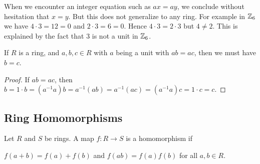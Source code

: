 \documentclass[11pt,fleqn,dvipsnames,usenames]{article}
\newcommand{\p}{\noindent}
\begin{document}
\p When we encounter an integer equation such as $ax = ay$, we conclude without hesitation that $x = y$.  But this does not generalize to any ring.  For example in $\mathbb{Z}_6$ we have $4\cdot 3 = 12 = 0$ and $2\cdot 3 = 6 = 0$.  Hence $4\cdot 3 = 2\cdot 3$ but $4\neq 2$.  This is explained by the fact that $3$ is not a unit in $\mathbb{Z}_6$.
\vsp

\begin{theorem}
If $R$ is a ring, and $a,b,c\in R$ with $a$ being a unit with $ab = ac$, then we must have $b = c$.
\end{theorem}
%
\begin{proof}
If $ab = ac$, then $b = 1\cdot b = (a^{-1}a)b = a^{-1}(ab) = a^{-1}(ac) = (a^{-1}a)c = 1\cdot c = c$.
\end{proof}
%
\subsection{Ring Homomorphisms}
\begin{definition}
Let $R$ and $S$ be rings.  A map $f:R\to S$ is a homomorphism if
\begin{center}
$f(a+b) = f(a) + f(b)$ and $f(ab) = f(a)f(b)$ for all $a,b\in R$.
\end{center}
\end{definition}
\smsp
\end{document}
